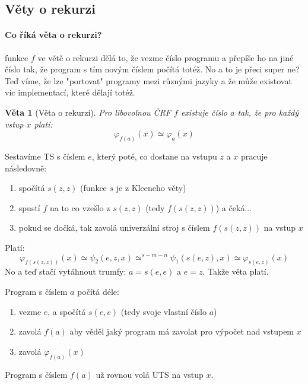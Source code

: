 \documentclass[a4paper]{article}      %
\newtheorem{theorem}{Věta}[section]
\newenvironment{proof}[1][Důkaz]{\begin{trivlist}
\item[\hskip \labelsep {\bfseries #1}]}{\end{trivlist}}
\newenvironment{definition}[1][Definice]{\begin{trivlist}
\item[\hskip \labelsep {\bfseries #1}]}{\end{trivlist}}
\newenvironment{remark}[1][Pozorování]{\begin{trivlist}
\item[\hskip \labelsep {\bfseries #1}]}{\end{trivlist}}
\begin{document}
\subsection{Věty o rekurzi}
\paragraph{Co říká věta o rekurzi?} funkce $f$ ve větě o rekurzi dělá to, že vezme číslo programu a přepíše ho na jiné číslo tak,
že program s tím novým číslem počítá totéž. No a to je přeci super ne? Teď víme, že lze "portovat" programy mezi různými jazyky a že
může existovat víc implementací, které dělají totéž.

\begin{theorem}[Věta o rekurzi]
Pro libovolnou ČRF $f$ existuje číslo $a$ tak, že pro každý vstup $x$ platí:
\[
\varphi_{f(a)}(x) \simeq \varphi_{a}(x)
\]
\end{theorem}

\begin{proof}
Sestavíme TS s číslem $e$, který poté, co dostane na vstupu $z$ a $x$ pracuje následovně:
\begin{enumerate}
\item spočítá $s(z,z)$ (funkce $s$ je z Kleeneho věty)
\item spustí $f$ na to  co vzešlo z $s(z,z)$ (tedy $f(s(z,z))$) a čeká...
\item pokud se dočká, tak zavolá univerzální stroj s číslem $f(s(z,z))$ na vstup $x$
\end{enumerate}
Platí:
\[
\varphi_{f(s(z,z))}(x) \simeq \psi_{2}(e,z,x) \simeq^{s-m-n} \psi_{1}(s(e,z),x) \simeq \varphi_{s(e,z)}(x)
\]
No a teď stačí vytáhnout trumfy: $a=s(e,e)$ a $e=z$. Takže věta platí.
\end{proof}

\begin{remark}
Program s číslem $a$ počítá déle:
\begin{enumerate}
\item vezme $e$, a spočítá $s(e,e)$ (tedy svoje vlastní číslo $a$)
\item zavolá $f(a)$ aby věděl jaký program má zavolat pro výpočet nad vstupem $x$
\item zavolá $\varphi_{f(a)}(x)$
\end{enumerate}
Program s číslem $f(a)$ už rovnou volá UTS na vstup $x$.
\end{remark}

\begin{definition}[Produktivní množina]
\end{definition}
\end{document}
